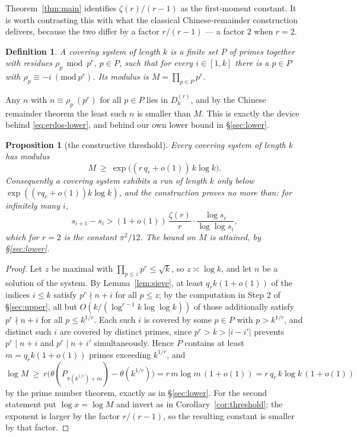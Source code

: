 \documentclass[10pt,a4paper]{amsart}
\newtheorem{proposition}[theorem]{Proposition}
\newtheorem*{definition*}{Definition}
\numberwithin{equation}{section}
\begin{document}
Theorem~\ref{thm:main} identifies $\zeta(r)/(r-1)$ as the first-moment constant. It is worth
contrasting this with what the classical Chinese-remainder construction delivers, because
the two differ by a factor $r/(r-1)$ --- a factor $2$ when $r=2$.

\begin{definition*}
A \emph{covering system of length $k$} is a finite set $P$ of primes together with residues
$\rho_p\bmod p^{r}$, $p\in P$, such that for every $i\in[1,k]$ there is a $p\in P$ with
$\rho_p\equiv-i\ (\mathrm{mod}\ p^{r})$. Its \emph{modulus} is $M=\prod_{p\in P}p^{r}$.
\end{definition*}

Any $n$ with $n\equiv\rho_p\ (p^{r})$ for all $p\in P$ lies in $D^{(r)}_k$, and by the
Chinese remainder theorem the least such $n$ is smaller than $M$. This is exactly the device
behind \eqref{eq:erdos-lower}, and behind our own lower bound in \S\ref{sec:lower}.

\begin{proposition}[the constructive threshold]\label{prop:crt}
Every covering system of length $k$ has modulus
\[
  M\ \ge\ \exp\bigl((r\,q_r+o(1))\,k\log k\bigr).
\]
Consequently a covering system exhibits a run of length $k$ only below
$\exp((rq_r+o(1))k\log k)$, and the construction proves no more than: for infinitely many
$i$,
\[
  s_{i+1}-s_i>(1+o(1))\,\frac{\zeta(r)}{r}\cdot\frac{\log s_i}{\log\log s_i},
\]
which for $r=2$ is the constant $\pi^{2}/12$. The bound on $M$ is attained, by
\S\ref{sec:lower}.
\end{proposition}

\begin{proof}
Let $z$ be maximal with $\prod_{p\le z}p^{r}\le\sqrt k$, so $z\asymp\log k$, and let $n$ be
a solution of the system. By Lemma~\ref{lem:sieve}, at least $q_rk(1+o(1))$ of the indices
$i\le k$ satisfy $p^{r}\nmid n+i$ for all $p\le z$; by the computation in Step 2 of
\S\ref{sec:upper}, all but $O(k/(\log^{r-1}k\log\log k))$ of those additionally satisfy
$p^{r}\nmid n+i$ for all $p\le k^{1/r}$. Each such $i$ is covered by some $p\in P$ with
$p>k^{1/r}$, and distinct such $i$ are covered by distinct primes, since $p^{r}>k>|i-i'|$
prevents $p^{r}\mid n+i$ and $p^{r}\mid n+i'$ simultaneously. Hence $P$ contains at least
$m=q_rk(1+o(1))$ primes exceeding $k^{1/r}$, and
\[
  \log M\ \ge\ r\bigl(\theta(P_{\pi(k^{1/r})+m})-\theta(k^{1/r})\bigr)
  =r\,m\log m\,(1+o(1))=r\,q_r\,k\log k\,(1+o(1))
\]
by the prime number theorem, exactly as in \S\ref{sec:lower}. For the second statement put
$\log x=\log M$ and invert as in Corollary~\ref{cor:threshold}; the exponent is larger by
the factor $r/(r-1)$, so the resulting constant is smaller by that factor.
\end{proof}
\end{document}
